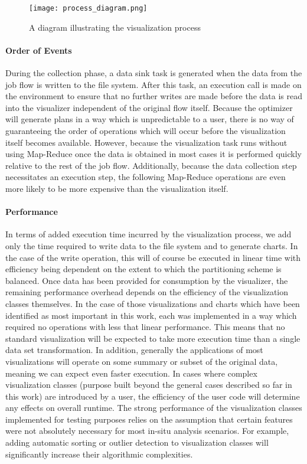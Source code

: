 \begin{figure}
	\centering
	\texttt{[image: process\_diagram.png]}
	\caption{A diagram illustrating the visualization process}
	\label{fig:process}
\end{figure}

\paragraph{Order of Events}
During the collection phase, a data sink task is generated when the data from the job flow is written to the file system. After this task, an execution call is made on the environment to ensure that no further writes are made before the data is read into the visualizer independent of the original flow itself. Because the optimizer will generate plans in a way which is unpredictable to a user, there is no way of guaranteeing the order of operations which will occur before the visualization itself becomes available. However, because the visualization task runs without using Map-Reduce once the data is obtained in most cases it is performed quickly relative to the rest of the job flow. Additionally, because the data collection step necessitates an execution step, the following Map-Reduce operations are even more likely to be more expensive than the visualization itself.

\paragraph{Performance}
In terms of added execution time incurred by the visualization process, we add only the time required to write data to the file system and to generate charts. In the case of the write operation, this will of course be executed in linear time with efficiency being dependent on the extent to which the partitioning scheme is balanced. Once data has been provided for consumption by the visualizer, the remaining performance overhead depends on the efficiency of the visualization classes themselves. In the case of those visualizations and charts which have been identified as most important in this work, each was implemented in a way which required no operations with less that linear performance. This means that no standard visualization will be expected to take more execution time than a single data set transformation. In addition, generally the applications of most visualizations will operate on some summary or subset of the original data, meaning we can expect even faster execution. In cases where complex visualization classes (purpose built beyond the general cases described so far in this work) are introduced by a user, the efficiency of the user code will determine any effects on overall runtime. The strong performance of the visualization classes implemented for testing purposes relies on the assumption that certain features were not absolutely necessary for most in-situ analysis scenarios. For example, adding automatic sorting or outlier detection to visualization classes will significantly increase their algorithmic complexities.
